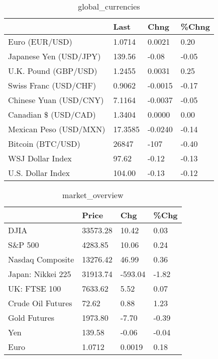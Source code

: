 \documentclass{article}%
\begin{document}
%


\begin{table}[htbp]%
\caption{global\_currencies}%
\centering%
\begin{adjustbox}{width=1\textwidth}%
\begin{tabular}{llll}
\toprule
                       &    Last &    Chng & \%Chng \\
\midrule
        Euro (EUR/USD) &  1.0714 &  0.0021 &  0.20 \\
Japanese Yen (USD/JPY) &  139.56 &   -0.08 & -0.05 \\
  U.K. Pound (GBP/USD) &  1.2455 &  0.0031 &  0.25 \\
 Swiss Franc (USD/CHF) &  0.9062 & -0.0015 & -0.17 \\
Chinese Yuan (USD/CNY) &  7.1164 & -0.0037 & -0.05 \\
  Canadian \$ (USD/CAD) &  1.3404 &  0.0000 &  0.00 \\
Mexican Peso (USD/MXN) & 17.3585 & -0.0240 & -0.14 \\
     Bitcoin (BTC/USD) &   26847 &    -107 & -0.40 \\
      WSJ Dollar Index &   97.62 &   -0.12 & -0.13 \\
     U.S. Dollar Index &  104.00 &   -0.13 & -0.12 \\
\bottomrule
\end{tabular}
%
\end{adjustbox}%
\end{table}

%


\begin{table}[htbp]%
\caption{market\_overview}%
\centering%
\begin{adjustbox}{width=1\textwidth}%
\begin{tabular}{llll}
\toprule
                  &    Price &     Chg &  \%Chg \\
\midrule
             DJIA & 33573.28 &   10.42 &  0.03 \\
          S\&P 500 &  4283.85 &   10.06 &  0.24 \\
 Nasdaq Composite & 13276.42 &   46.99 &  0.36 \\
Japan: Nikkei 225 & 31913.74 & -593.04 & -1.82 \\
     UK: FTSE 100 &  7633.62 &    5.52 &  0.07 \\
Crude Oil Futures &    72.62 &    0.88 &  1.23 \\
     Gold Futures &  1973.80 &   -7.70 & -0.39 \\
              Yen &   139.58 &   -0.06 & -0.04 \\
             Euro &   1.0712 &  0.0019 &  0.18 \\
\bottomrule
\end{tabular}
%
\end{adjustbox}%
\end{table}

%
\end{document}
